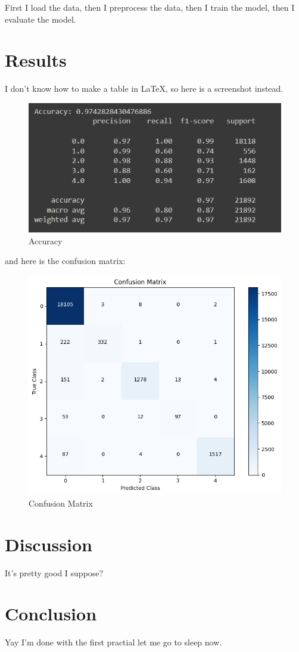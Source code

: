 \documentclass[conference]{IEEEtran}
\begin{document}
First I load the data, then I preprocess the data, then I train the model, then I evaluate the model.

\section{Results}
I don't know how to make a table in LaTeX, so here is a screenshot instead.
\begin{figure}[h]
    \centering
    \includegraphics[width=\linewidth]{accuracy.png}
    \caption{Accuracy}
    \label{fig:accuracy}
\end{figure}

and here is the confusion matrix:

\begin{figure}[h]
    \centering
    \includegraphics[width=\linewidth]{confusionmatrix.png}
    \caption{Confusion Matrix}
    \label{fig:accuracy}
\end{figure}

\section{Discussion}
It's pretty good I suppose?

\section{Conclusion}
Yay I'm done with the first practial let me go to sleep now.
\end{document}

